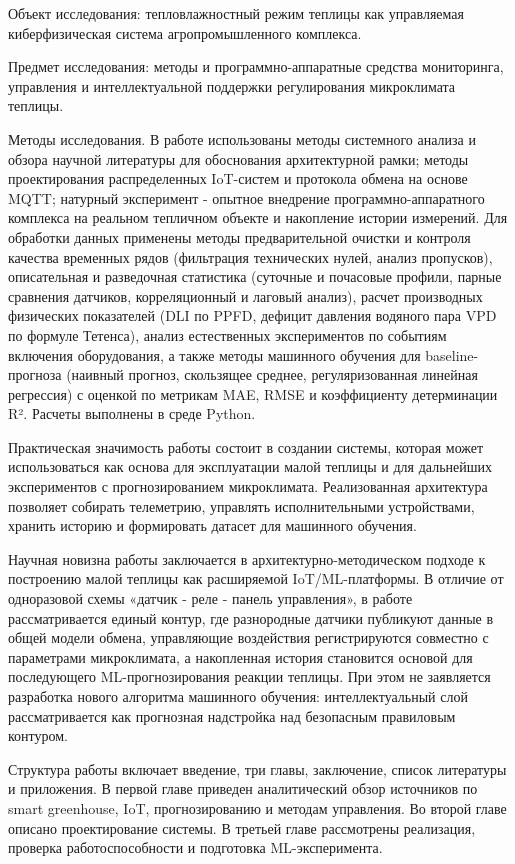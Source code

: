\documentclass[a4paper,14pt]{extarticle}
\begin{document}
Объект исследования: тепловлажностный режим теплицы как управляемая
киберфизическая система агропромышленного комплекса.

Предмет исследования: методы и программно-аппаратные средства
мониторинга, управления и интеллектуальной поддержки регулирования
микроклимата теплицы.

Методы исследования. В работе использованы методы системного анализа и
обзора научной литературы для обоснования архитектурной рамки; методы
проектирования распределенных IoT-систем и протокола обмена на основе
MQTT; натурный эксперимент - опытное внедрение программно-аппаратного
комплекса на реальном тепличном объекте и накопление истории измерений.
Для обработки данных применены методы предварительной очистки и контроля
качества временных рядов (фильтрация технических нулей, анализ
пропусков), описательная и разведочная статистика (суточные и почасовые
профили, парные сравнения датчиков, корреляционный и лаговый анализ),
расчет производных физических показателей (DLI по PPFD, дефицит давления
водяного пара VPD по формуле Тетенса), анализ естественных экспериментов
по событиям включения оборудования, а также методы машинного обучения
для baseline-прогноза (наивный прогноз, скользящее среднее,
регуляризованная линейная регрессия) с оценкой по метрикам MAE, RMSE и
коэффициенту детерминации R². Расчеты выполнены в среде Python.

Практическая значимость работы состоит в создании системы, которая может
использоваться как основа для эксплуатации малой теплицы и для
дальнейших экспериментов с прогнозированием микроклимата. Реализованная
архитектура позволяет собирать телеметрию, управлять исполнительными
устройствами, хранить историю и формировать датасет для машинного
обучения.

Научная новизна работы заключается в архитектурно-методическом подходе к
построению малой теплицы как расширяемой IoT/ML-платформы. В отличие от
одноразовой схемы «датчик - реле - панель управления», в работе
рассматривается единый контур, где разнородные датчики публикуют данные
в общей модели обмена, управляющие воздействия регистрируются совместно
с параметрами микроклимата, а накопленная история становится основой для
последующего ML-прогнозирования реакции теплицы. При этом не заявляется
разработка нового алгоритма машинного обучения: интеллектуальный слой
рассматривается как прогнозная надстройка над безопасным правиловым
контуром.

Структура работы включает введение, три главы, заключение, список
литературы и приложения. В первой главе приведен аналитический обзор
источников по smart greenhouse, IoT, прогнозированию и методам
управления. Во второй главе описано проектирование системы. В третьей
главе рассмотрены реализация, проверка работоспособности и подготовка
ML-эксперимента.
\end{document}
